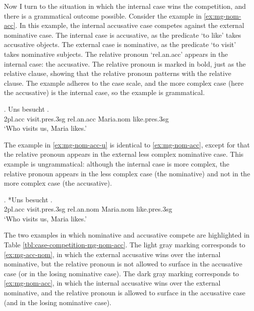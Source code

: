 Now I turn to the situation in which the internal case wins the competition, and there is a grammatical outcome possible.
Consider the example in \ref{ex:mg-nom-acc}. In this example, the internal accusative case competes against the external nominative case.
The internal case is accusative, as the predicate  `to like' takes accusative objects.
The external case is nominative, as the predicate  `to visit' takes nominative subjects.
The relative pronoun  `\ac{rel}.\ac{an}.\ac{acc}' appears in the internal case: the accusative. The relative pronoun is marked in bold, just as the relative clause, showing that the relative pronoun patterns with the relative clause.
The example adheres to the case scale, and the more complex case (here the accusative) is the internal case, so the example is grammatical.

\exg. Uns besucht   .\\
 2\ac{pl}.\ac{acc} visit.\ac{pres}.3\ac{sg}\scsub{[nom]} \ac{rel}.\ac{an}.\ac{acc} Maria.\ac{nom} like.\ac{pres}.3\ac{sg}\scsub{[acc]}\\
 `Who visits us, Maria likes.' \label{ex:mg-nom-acc}

The example in \ref{ex:mg-nom-acc-u} is identical to \ref{ex:mg-nom-acc}, except for that the relative pronoun appears in the external less complex nominative case. This example is ungrammatical: although the internal case is more complex, the relative pronoun appears in the less complex case (the nominative) and not in the more complex case (the accusative).

\exg. *Uns besucht   .\\
 2\ac{pl}.\ac{acc} visit.\ac{pres}.3\ac{sg}\scsub{[nom]} \ac{rel}.\ac{an}.\ac{nom} Maria.\ac{nom} like.\ac{pres}.3\ac{sg}\scsub{[acc]}\\
 `Who visits us, Maria likes.' \label{ex:mg-nom-acc-u}

The two examples in which nominative and accusative compete are highlighted in Table \ref{tbl:case-competition-mg-nom-acc}. The light gray marking corresponds to \ref{ex:mg-acc-nom}, in which the external accusative wins over the internal nominative, but the relative pronoun is not allowed to surface in the accusative case (or in the losing nominative case). The dark gray marking corresponds to \ref{ex:mg-nom-acc}, in which the internal accusative wins over the external nominative, and the relative pronoun is allowed to surface in the accusative case (and in the losing nominative case).

